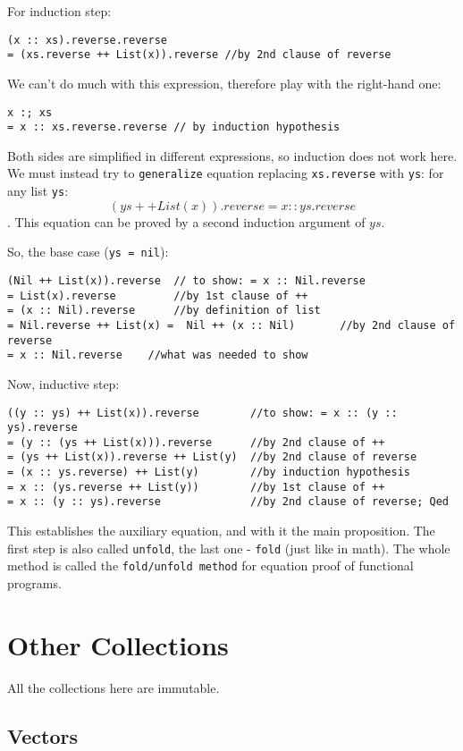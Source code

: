 \documentclass{scrartcl}
\newcommand{\term}[1]{\verb~#1~} %
\begin{document}
For induction step:
\begin{lstlisting}
(x :: xs).reverse.reverse
= (xs.reverse ++ List(x)).reverse //by 2nd clause of reverse
\end{lstlisting}
We can't do much with this expression, therefore play with the right-hand one:
\begin{lstlisting}
x :; xs
= x :: xs.reverse.reverse // by induction hypothesis
\end{lstlisting}

Both sides are simplified in different expressions, so induction does not work
here. We must instead try to \term{generalize} equation replacing
\lstinline|xs.reverse| with \lstinline|ys|: for any list \lstinline|ys|:
$$(ys ++ List(x)).reverse = x :: ys.reverse$$. This equation can be proved by a
second induction argument of $ys$.

So, the base case (\lstinline|ys = nil|):
\begin{lstlisting}
(Nil ++ List(x)).reverse  // to show: = x :: Nil.reverse
= List(x).reverse         //by 1st clause of ++
= (x :: Nil).reverse      //by definition of list
= Nil.reverse ++ List(x) =  Nil ++ (x :: Nil)       //by 2nd clause of reverse
= x :: Nil.reverse    //what was needed to show
\end{lstlisting}

Now, inductive step:
\begin{lstlisting}
((y :: ys) ++ List(x)).reverse        //to show: = x :: (y :: ys).reverse
= (y :: (ys ++ List(x))).reverse      //by 2nd clause of ++
= (ys ++ List(x)).reverse ++ List(y)  //by 2nd clause of reverse
= (x :: ys.reverse) ++ List(y)        //by induction hypothesis
= x :: (ys.reverse ++ List(y))        //by 1st clause of ++
= x :: (y :: ys).reverse              //by 2nd clause of reverse; Qed
\end{lstlisting}
This establishes the auxiliary equation, and with it the main proposition. The
first step is also called \term{unfold}, the last one - \term{fold} (just like
in math). The whole method is called the \term{fold/unfold method} for equation
proof of functional programs.

\section{Other Collections}
\label{sec:OtherCollections}
All the collections here are immutable.

\subsection{Vectors}
\label{sec:Vectors}
\end{document}
